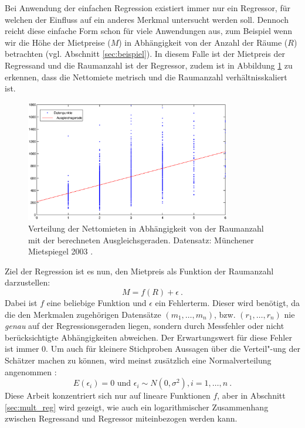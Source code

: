 Bei Anwendung der einfachen Regression existiert immer nur ein Regressor, für welchen der Einfluss auf ein anderes Merkmal untersucht werden soll.
Dennoch reicht diese einfache Form schon für viele Anwendungen aus, zum Beispiel wenn wir die Höhe der Mietpreise ($M$) in Abhängigkeit von der Anzahl der Räume ($R$) betrachten (vgl. Abschnitt \ref{sec:beispiel}).
In diesem Falle ist der Mietpreis der Regressand und die Raumanzahl ist der Regressor, zudem ist in Abbildung \ref{fig:nm_rooms_distribution} zu erkennen, dass die Nettomiete metrisch und die Raumanzahl verhältnisskaliert ist.
\begin{figure}[t]
  \centering
  \includegraphics[width=0.8\textwidth]{figures/nm_rooms_distribution}
  \caption{Verteilung der Nettomieten in Abhängigkeit von der Raumanzahl mit der berechneten Ausgleichsgeraden. Datensatz: Münchener Mietspiegel 2003 \cite{Fahrmeir2011}.}
  \label{fig:nm_rooms_distribution}
\end{figure}
Ziel der Regression ist es nun, den Mietpreis als Funktion der Raumanzahl darzustellen:
\begin{equation*}
 M = f(R) + \epsilon ~.
\end{equation*}
Dabei ist $f$ eine beliebige Funktion und $\epsilon$ ein Fehlerterm.
Dieser wird benötigt, da die den Merkmalen zugehörigen Datensätze $(m_1, \dots, m_n)$, bzw. $(r_1, \dots, r_n)$ nie \textit{genau} auf der Regressionsgeraden liegen, sondern durch Messfehler oder nicht berücksichtigte Abhängigkeiten abweichen.
Der Erwartungswert für diese Fehler ist immer $0$. 
Um auch für kleinere Stichproben Aussagen über die Verteil"-ung der Schätzer machen zu können, wird meinst zusätzlich eine Normalverteilung angenommen \cite[S. 479]{Fahrmeir2010}:
\begin{equation*}
  E(\epsilon_i) = 0 \text{ und } \epsilon_i \sim N(0,\sigma^2), i = 1, \dots, n ~.
\end{equation*}
Diese Arbeit konzentriert sich nur auf lineare Funktionen $f$, aber in Abschnitt \ref{sec:mult_reg} wird gezeigt, wie auch ein logarithmischer Zusammenhang zwischen Regressand und Regressor miteinbezogen werden kann.
